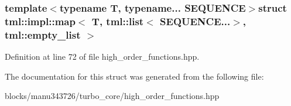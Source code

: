\subsubsection*{template$<$typename T, typename... S\+E\+Q\+U\+E\+N\+C\+E$>$struct tml\+::impl\+::map$<$ T, tml\+::list$<$ S\+E\+Q\+U\+E\+N\+C\+E...$>$, tml\+::empty\+\_\+list $>$}



Definition at line 72 of file high\+\_\+order\+\_\+functions.\+hpp.



The documentation for this struct was generated from the following file\+:\begin{DoxyCompactItemize}
\item 
blocks/manu343726/turbo\+\_\+core/high\+\_\+order\+\_\+functions.\+hpp\end{DoxyCompactItemize}

